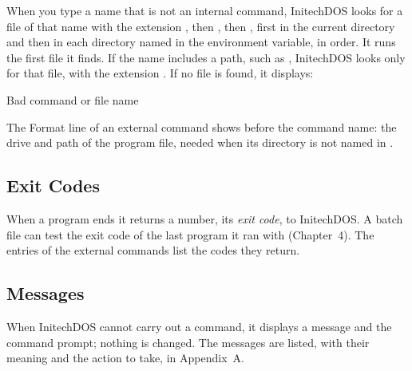 When you type a name that is not an internal command, InitechDOS looks for
a file of that name with the extension , then , then
, first in the current directory and then in each directory named
in the  environment variable, in order.  It runs the first file it
finds.  If the name includes a path, such as ,
InitechDOS looks only for that file, with the extension .  If no
file is found, it displays:
\begin{TypeIn}
Bad command or file name
\end{TypeIn}
The Format line of an external command shows %
 before the command name: the drive and path of the program
file, needed when its directory is not named in .

\subsection{Exit Codes}
When a program ends it returns a number, its \emph{exit code}, to
InitechDOS.  A batch file can test the exit code of the last program it ran
with  (Chapter~4).  The entries of the external commands
list the codes they return.

\subsection{Messages}
When InitechDOS cannot carry out a command, it displays a message and the
command prompt; nothing is changed.  The messages are listed, with their
meaning and the action to take, in Appendix~A.




